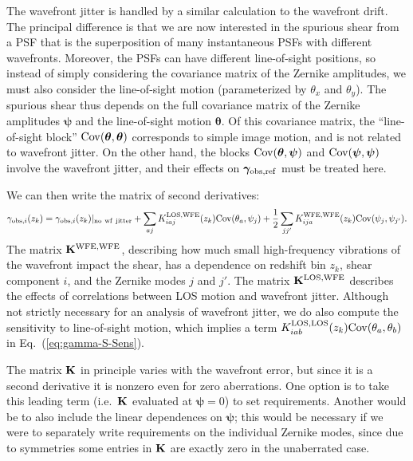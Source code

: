 \documentclass[aps,prd, amsmath,amssymb,superscriptaddress,showkeys,nofootinbib,reprint,preprintnumbers]{revtex4-1}
\begin{document}
\begin{widetext}
The wavefront jitter is handled by a similar calculation to the
wavefront drift. The principal difference is that we are now
interested in the spurious shear from a PSF that is the superposition
of many instantaneous PSFs with different wavefronts. Moreover, the
PSFs can have different line-of-sight positions, so instead of simply
considering the covariance matrix of the Zernike amplitudes, we must
also consider the line-of-sight motion (parameterized by $\theta_x$
and $\theta_y$). The spurious shear thus depends on the full
covariance matrix of the Zernike amplitudes ${\boldsymbol\psi}$ and
the line-of-sight motion ${\boldsymbol\theta}$. Of this covariance
matrix, the ``line-of-sight block'' ${\rm
Cov}({\boldsymbol\theta},{\boldsymbol\theta})$ corresponds to simple
image motion, and is not related to wavefront jitter. On the other
hand, the blocks ${\rm Cov}({\boldsymbol\theta},{\boldsymbol\psi})$
and ${\rm Cov}({\boldsymbol\psi},{\boldsymbol\psi})$ involve the
wavefront jitter, and their effects on ${\boldsymbol\gamma}_{\rm
obs,ref}$ must be treated here.

We can then write the matrix of second derivatives:
\begin{equation}
\gamma_{{\rm obs},i}(z_k) = \gamma_{{\rm obs},i}(z_k)|_{\rm no~wf~jitter}
+ \sum_{aj} K^{\rm LOS,WFE}_{iaj}(z_k) {\rm Cov}({\theta}_a,{\psi}_j)
+ \frac12 \sum_{jj'} K^{\rm WFE,WFE}_{ija}(z_k) {\rm Cov}({\psi}_j,{\psi}_{j'}).
\label{eq:gamma-S-Sens}
\end{equation}
The matrix ${\bf K}^{\rm WFE,WFE}$, describing how much small
high-frequency vibrations of the wavefront impact the shear, has a
dependence on redshift bin $z_k$, shear component $i$, and the Zernike
modes $j$ and $j'$. The matrix ${\bf K}^{\rm LOS,WFE}$ describes the
effects of correlations between LOS motion and wavefront jitter.
Although not strictly necessary for an analysis of wavefront jitter, we do also compute the sensitivity to line-of-sight motion, which implies a term $K^{\rm LOS,LOS}_{iab}(z_k) {\rm Cov}({\theta}_a,{\theta}_b)$ in Eq.~(\ref{eq:gamma-S-Sens}).

The matrix ${\bf K}$ in principle varies with the wavefront error, but
since it is a second derivative it is nonzero even for zero
aberrations. One option is to take this leading term (i.e.\ ${\bf K}$
evaluated at ${\boldsymbol\psi}=0$) to set requirements. Another would
be to also include the linear dependences on ${\boldsymbol\psi}$; this
would be necessary if we were to separately write requirements on the
individual Zernike modes, since due to symmetries some entries in
${\bf K}$ are exactly zero in the unaberrated case.


\end{widetext}
\end{document}
